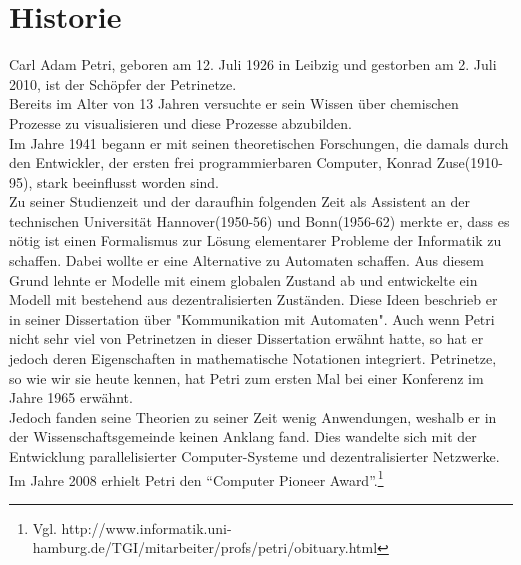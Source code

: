 \section{Historie}
Carl Adam Petri, geboren am 12. Juli 1926 in Leibzig und gestorben am 2. Juli 2010, ist der Schöpfer der Petrinetze. \\
Bereits im Alter von 13 Jahren versuchte er sein Wissen über chemischen Prozesse zu visualisieren und diese Prozesse abzubilden.\\
Im Jahre 1941 begann er mit seinen theoretischen Forschungen, die damals durch den Entwickler, der ersten frei programmierbaren Computer, Konrad Zuse(1910-95), stark beeinflusst worden sind.\\
Zu seiner Studienzeit und der daraufhin folgenden Zeit als Assistent an der technischen Universität Hannover(1950-56) und Bonn(1956-62) merkte er, dass es nötig ist einen Formalismus zur Lösung elementarer Probleme der Informatik zu schaffen.
Dabei wollte er eine Alternative zu Automaten schaffen.
Aus diesem Grund lehnte er Modelle mit einem globalen Zustand ab und entwickelte ein Modell mit bestehend aus dezentralisierten Zuständen.
Diese Ideen beschrieb er in seiner Dissertation über "Kommunikation mit Automaten".
Auch wenn Petri nicht sehr viel von Petrinetzen in dieser Dissertation erwähnt hatte, so hat er jedoch deren Eigenschaften in mathematische Notationen integriert.
Petrinetze, so wie wir sie heute kennen, hat Petri zum ersten Mal bei einer Konferenz im Jahre 1965 erwähnt. \\ Jedoch fanden seine Theorien zu seiner Zeit wenig Anwendungen, weshalb er in der Wissenschaftsgemeinde keinen Anklang fand. Dies wandelte sich mit der Entwicklung parallelisierter Computer-Systeme und dezentralisierter Netzwerke. Im Jahre 2008 erhielt Petri den \enquote{Computer Pioneer Award}.\footnote{Vgl. http://www.informatik.uni-hamburg.de/TGI/mitarbeiter/profs/petri/obituary.html}
